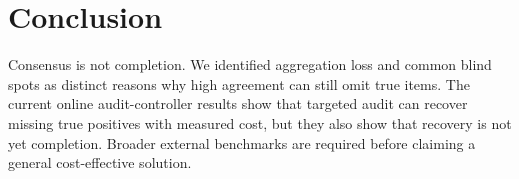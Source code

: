 \documentclass[letterpaper]{article}
\begin{document}
\section{Conclusion}

Consensus is not completion. We identified aggregation loss and common blind
spots as distinct reasons why high agreement can still omit true items. The
current online audit-controller results show that targeted audit can recover
missing true positives with measured cost, but they also show that recovery is
not yet completion. Broader external benchmarks are required before claiming a
general cost-effective solution.


\end{document}
